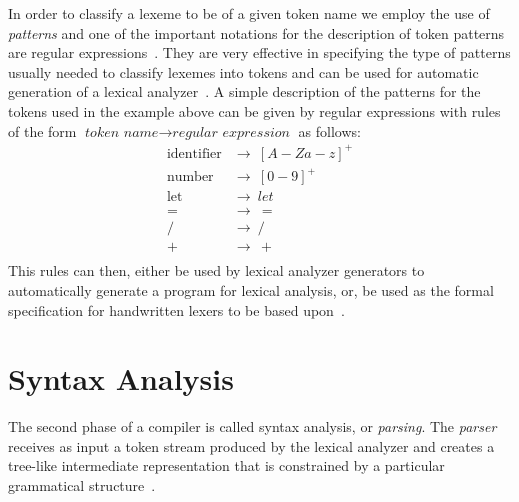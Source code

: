 \documentclass[
  oneside,
  english,
  coorientadorbanca,
  embeddedlogo,
  noabntexcite
]{ufsc-thesis-rn46-2019}
\begin{document}
In order to classify a lexeme to be of a given token name we employ the use of \textit{patterns} and one of the important notations for the description of token patterns are regular expressions~\cite{Aho:2006:CPT:1177220}.
They are very effective in specifying the type of patterns usually needed to classify lexemes into tokens and can be used for automatic generation of a lexical analyzer~\cite{Aho:2006:CPT:1177220}.
A simple description of the patterns for the tokens used in the example above can be given by regular expressions with rules of the form $\textit{token name} \rightarrow \textit{regular expression}$ as follows:
\begin{equation*}
  \begin{aligned}
    \textrm{identifier} & \rightarrow \ {[A-Za-z]}^+ \\
    \textrm{number}     & \rightarrow \ {[0-9]}^+    \\
    \textrm{let}        & \rightarrow \ let          \\
    =                   & \rightarrow \  =           \\
    /                   & \rightarrow \ /            \\
    +                   & \rightarrow \ +            \\
  \end{aligned}
\end{equation*}
This rules can then, either be used by lexical analyzer generators to automatically generate a program for lexical analysis, or, be used as the formal specification for handwritten lexers to be based upon~\cite{Aho:2006:CPT:1177220}.

\section{Syntax Analysis}\label{chapter:background:sec:syntax}

The second phase of a compiler is called syntax analysis, or \textit{parsing}.
The \textit{parser} receives as input a token stream produced by the lexical analyzer and creates a tree-like intermediate representation that is constrained by a particular grammatical structure~\cite{Aho:2006:CPT:1177220}.
\end{document}
